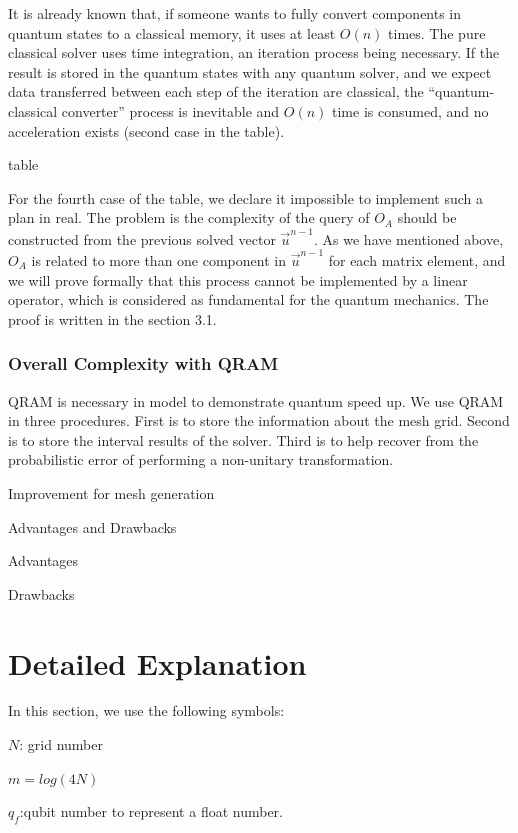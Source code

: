 \documentclass[%
 reprint,
 amsmath,amssymb,
pra,
]{revtex4-1}
\begin{document}
It is already known that, if someone wants to fully convert components in quantum states to a classical memory, it uses at least $O(n)$ times. The pure classical solver uses time integration, an iteration process being necessary. If the result is stored in the quantum states with any quantum solver, and we expect data transferred between each step of the iteration are classical, the “quantum-classical converter” process is inevitable and $O(n)$ time is consumed, and no acceleration exists (second case in the table).

table

For the fourth case of the table, we declare it impossible to implement such a plan in real. The problem is the complexity of the query of $O_A$ should be constructed from the previous solved vector $\vec{u}^{n-1}$. As we have mentioned above, $O_A$ is related to more than one component in $\vec{u}^{n-1}$ for each matrix element, and we will prove formally that this process cannot be implemented by a linear operator, which is considered as fundamental for the quantum mechanics. The proof is written in the section 3.1.

\subsubsection{Overall Complexity with QRAM }

QRAM is necessary in model to demonstrate quantum speed up. We use QRAM in three procedures. First is to store the information about the mesh grid. Second is to store the interval results of the solver. Third is to help recover from the probabilistic error of performing a non-unitary transformation.

Improvement for mesh generation

Advantages and Drawbacks

Advantages

Drawbacks







\section{Detailed Explanation}
In this section, we use the following symbols:

$N$: grid number

$m=log(4N)$

$q_f$:qubit number to represent a float number.
\end{document}
